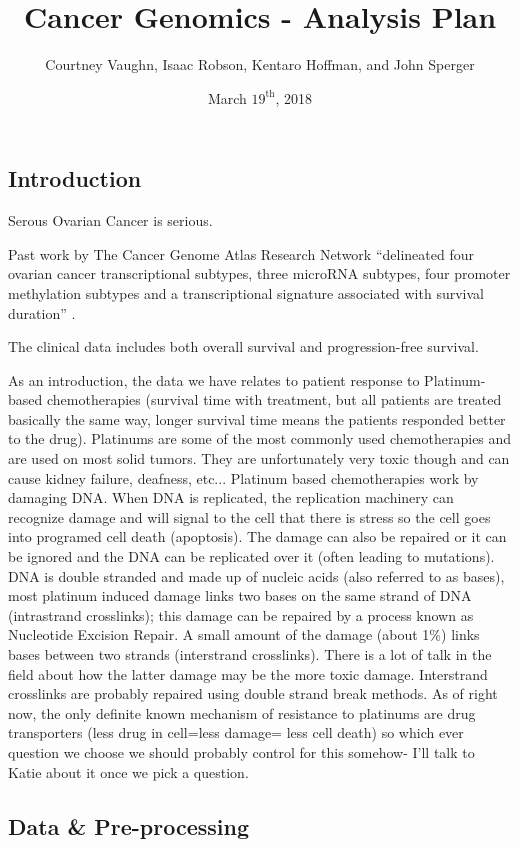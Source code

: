 \documentclass{article}
\author{
Courtney Vaughn, Isaac Robson, Kentaro Hoffman, and John Sperger
}
\title{Cancer Genomics - Analysis Plan}
\date{March $19^{\mathrm{th}}$, 2018}
\begin{document}
\maketitle

\subsection{Introduction}

Serous Ovarian Cancer is serious. 

Past work by The Cancer Genome Atlas Research Network ``delineated four ovarian cancer transcriptional subtypes, three microRNA subtypes, four promoter methylation subtypes and a transcriptional
signature associated with survival duration'' \cite{cancer2011integrated}.

The clinical data includes both overall survival and progression-free survival. 

As an introduction, the data we have relates to patient response to Platinum-based chemotherapies (survival time with treatment, but all patients are treated basically the same way, longer survival time means the patients responded better to the drug). Platinums are some of the most commonly used chemotherapies and are used on most solid tumors.  They are unfortunately very toxic though and can cause kidney failure, deafness, etc... Platinum based chemotherapies work by damaging DNA. When DNA is replicated, the replication machinery can recognize damage and will signal to the cell that there is stress so the cell goes into programed cell death (apoptosis).  The damage can also be repaired or it can be ignored and the DNA can be replicated over it (often leading to mutations).  DNA is double stranded and made up of nucleic acids (also referred to as bases), most platinum induced damage links two bases on the same strand of DNA (intrastrand crosslinks); this damage can be repaired by a process known as Nucleotide Excision Repair. A small amount of the damage (about 1\%) links bases between two strands (interstrand crosslinks). There is a lot of talk in the field about how the latter damage may be the more toxic damage.  Interstrand crosslinks are probably repaired using double strand break methods.  As of right now, the only definite known mechanism of resistance to platinums are drug transporters (less drug in cell=less damage= less cell death) so which ever question we choose we should probably control for this somehow- I'll talk to Katie about it once we pick a question.

\subsection{Data \& Pre-processing}
\end{document}
